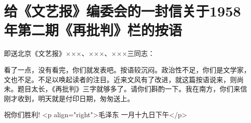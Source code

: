 \section[给《文艺报》编委会的一封信关于1958年第二期《再批判》栏的按语（一九五八年一月十九日）]{给《文艺报》编委会的一封信关于1958年第二期《再批判》栏的按语}


即送北京《文艺报》×××、×××、×××三同志：

看了一点，没有看完，你们就发表吧。按语较沉闷。政治性不足，你们是文学家，文也不足。不足以唤起读者的注目。近来文风有了改进，就这篇按语说来，则尚未。题目太长，《再批判》三字就够多了。请你们斟酌一下。我在南方，你们来信刚才收到，明天就是付印日期，匆匆送上。

祝你们胜利!
<p align="right">毛泽东
一月十九日下午</p>

